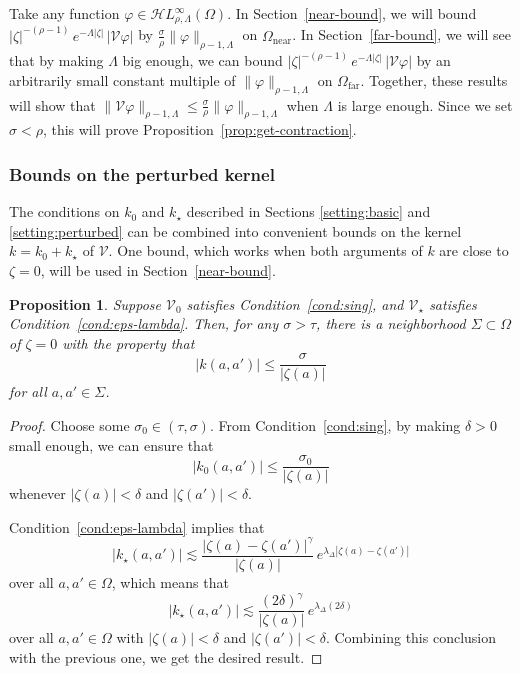 \documentclass{article}
\theoremstyle{definition}
\theoremstyle{plain}
\newtheorem{proposition}{Proposition}
\newcommand{\singexp}[2]{\mathcal{H}L^\infty_{#1, #2}}
\newcommand{\volterra}{\mathcal{V}}
\newcommand{\hardpart}{\mathcal{V}_0}
\newcommand{\softpart}{\mathcal{V}_\star}
\newcommand{\kerwhole}{k}
\newcommand{\hardker}{k_0}
\newcommand{\softker}{k_\star}
\newcommand{\domain}{\Omega}
\newcommand{\near}{\Omega_\text{near}}
\newcommand{\far}{\Omega_\text{far}}
\begin{document}
Take any function $\varphi \in \singexp{\rho}{\Lambda}(\domain)$. In Section~\ref{near-bound}, we will bound $|\zeta|^{-(\rho-1)}\,e^{-\Lambda|\zeta|}\,|\volterra\varphi|$ by $\tfrac{\sigma}{\rho} \|\varphi\|_{\rho-1, \Lambda}$ on $\near$. In Section~\ref{far-bound}, we will see that by making $\Lambda$ big enough, we can bound $|\zeta|^{-(\rho-1)}\,e^{-\Lambda|\zeta|}\,|\volterra\varphi|$ by an arbitrarily small constant multiple of $\|\varphi\|_{\rho-1, \Lambda}$ on $\far$. Together, these results will show that $\|\volterra \varphi\|_{\rho-1, \Lambda} \le \tfrac{\sigma}{\rho} \|\varphi\|_{\rho-1, \Lambda}$ when $\Lambda$ is large enough. Since we set $\sigma < \rho$, this will prove Proposition~\ref{prop:get-contraction}.
\subsubsection{Bounds on the perturbed kernel}\label{sec:bounds on k}
The conditions on $\hardker$ and $\softker$ described in Sections \ref{setting:basic} and \ref{setting:perturbed} can be combined into convenient bounds on the kernel $\kerwhole = \hardker + \softker$ of $\volterra$. One bound, which works when both arguments of $\kerwhole$ are close to $\zeta = 0$, will be used in Section~\ref{near-bound}.
\begin{proposition}\label{prop:whole-ker-near-bound}
Suppose $\hardpart$ satisfies Condition~\eqref{cond:sing}, and $\softpart$ satisfies Condition~\eqref{cond:eps-lambda}. Then, for any $\sigma > \tau$, there is a neighborhood $\Sigma \subset \Omega$ of $\zeta = 0$ with the property that
\[ |\kerwhole(a, a')| \le \frac{\sigma}{|\zeta(a)|} \]
for all $a, a' \in \Sigma$.
\end{proposition}
\begin{proof}
Choose some $\sigma_0 \in (\tau, \sigma)$. From Condition~\eqref{cond:sing}, by making $\delta > 0$ small enough, we can ensure that
\[ |\hardker(a, a')| \le \frac{\sigma_0}{|\zeta(a)|} \]
whenever $|\zeta(a)| < \delta$ and $|\zeta(a')| < \delta$.

Condition~\eqref{cond:eps-lambda} implies that
\[ | \softker(a, a') | \lesssim\frac{|\zeta(a)-\zeta(a')|^\gamma}{|\zeta(a)|}\,e^{\lambda_\Delta|\zeta(a)-\zeta(a')|}\]
over all $a, a' \in \domain$, which means that
\[ | \softker(a, a') | \lesssim\frac{(2\delta)^\gamma}{|\zeta(a)|}\,e^{\lambda_\Delta(2\delta)}\]
over all $a, a' \in \domain$ with $|\zeta(a)| < \delta$ and $|\zeta(a')| < \delta$. Combining this conclusion with the previous one, we get the desired result.
\end{proof}
\end{document}
